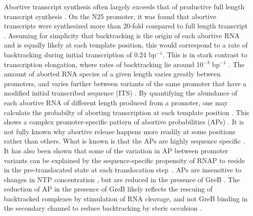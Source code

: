 Abortive transcript synthesis often largely exceeds that of productive full
length transcript synthesis \cite{carpousis_cycling_1980, hsu_initial_2006}.
On the N25 promoter, it was found that abortive transcripts were synthesized
more than 20-fold compared to full length transcript \cite{hsu_initial_2006}.
Assuming for simplicity that backtracking is the origin of each abortive RNA
and is equally likely at each template position, this would correspond to a
rate of backtracking during initial transcription of 0.24 bp$^{-1}$.
This is in stark contrast to transcription elongation, where rates of
backtracking lie around 10$^{-3}$ bp$^{-1}$ \cite{shaevitz_backtracking_2003}.
The amount of aborted RNA species of a given length varies greatly between
promoters, and varies further between variants of the same promoter that have
a modified initial transcribed sequence (ITS) \cite{hsu_promoter_2002}. By
quantifying the abundance of each abortive RNA of different length produced
from a promoter, one may calculate the probabilty of aborting transcription at
each template position \cite{hsu_quantitative_1996}.  This shows a complex
promoter-specific pattern of abortive probabilities (APs)
\cite{hsu_initial_2006,hsu_vitro_2003}. It is not fully known why abortive
release happens more readily at some positions rather than others. What is
known is that the APs are highly sequence specific \cite{hsu_vitro_2006}. It
has also been shown that some of the variation in AP between promoter variants
can be explained by the sequence-specific propensity of RNAP to reside in the
pre-translocated state at each translocation
step~\cite{skancke_sequence-dependent_2015}. APs are insensitive to changes in
NTP concentration \cite{hsu_vitro_2003}, but are reduced in the presence of
GreB \cite{hsu_initial_2006}. The reduction of AP in the presence of GreB
likely reflects the rescuing of backtracked complexes by stimulation of RNA
cleavage, and not GreB binding in the secondary channel to reduce backtracking
by steric occulsion \cite{opalka_structure_2003, hsu_initial_2006}.

